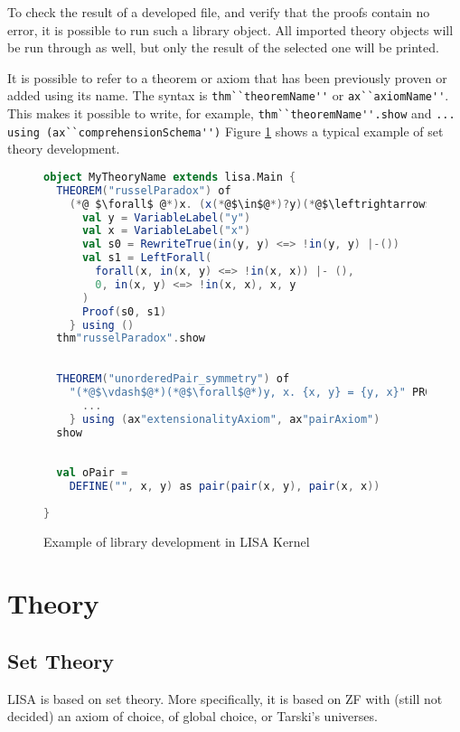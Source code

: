 To check the result of a developed file, and verify that the proofs contain no error, it is possible to run such a library object.
All imported theory objects will be run through as well, but only the result of the selected one will be printed.

It is possible to refer to a theorem or axiom that has been previously proven or added using its name. The syntax is \lstinline{thm``theoremName''}{} or \lstinline{ax``axiomName''}{}. This makes it possible to write, for example, \lstinline{thm``theoremName''.show}{} and \lstinline{... using (ax``comprehensionSchema'')} Figure \ref{fig:kernellibrary} shows a typical example of set theory development.


\begin{figure}[hp]
  \begin{lstlisting}[language=Scala, frame=single]
object MyTheoryName extends lisa.Main {
  THEOREM("russelParadox") of 
    (*@ $\forall$ @*)x. (x(*@$\in$@*)?y)(*@$\leftrightarrow$@*) (*@$\neg$@*)(x(*@$\in$@*)x)(*@$\vdash$@*) PROOF {
      val y = VariableLabel("y")
      val x = VariableLabel("x")
      val s0 = RewriteTrue(in(y, y) <=> !in(y, y) |-())
      val s1 = LeftForall(
        forall(x, in(x, y) <=> !in(x, x)) |- (),
        0, in(x, y) <=> !in(x, x), x, y
      )
      Proof(s0, s1)
    } using ()
  thm"russelParadox".show
  
  
  THEOREM("unorderedPair_symmetry") of
    "(*@$\vdash$@*)(*@$\forall$@*)y, x. {x, y} = {y, x}" PROOF {
      ...
    } using (ax"extensionalityAxiom", ax"pairAxiom")
  show
  
  
  val oPair = 
    DEFINE("", x, y) as pair(pair(x, y), pair(x, x))
  
}
\end{lstlisting}
  \caption{Example of library development in LISA Kernel}
  \label{fig:kernellibrary}
\end{figure}

\part{Theory}

\chapter{Set Theory}
\label{chapt:settheory}
LISA is based on set theory. More specifically, it is based on ZF with (still not decided) an axiom of choice, of global choice, or Tarski's universes.

